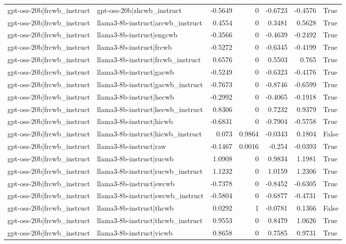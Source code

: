 \begin{table}
\begin{tabular}{l l r r r r l}
gpt-oss-20b|frcwb_instruct & gpt-oss-20b|zhcwb_instruct & -0.5649 & 0 & -0.6723 & -0.4576 & True \\
gpt-oss-20b|frcwb_instruct & llama3-8b-instruct|arcwb_instruct & 0.4554 & 0 & 0.3481 & 0.5628 & True \\
gpt-oss-20b|frcwb_instruct & llama3-8b-instruct|engcwb & -0.3566 & 0 & -0.4639 & -0.2492 & True \\
gpt-oss-20b|frcwb_instruct & llama3-8b-instruct|frcwb & -0.5272 & 0 & -0.6345 & -0.4199 & True \\
gpt-oss-20b|frcwb_instruct & llama3-8b-instruct|frcwb_instruct & 0.6576 & 0 & 0.5503 & 0.765 & True \\
gpt-oss-20b|frcwb_instruct & llama3-8b-instruct|gacwb & -0.5249 & 0 & -0.6323 & -0.4176 & True \\
gpt-oss-20b|frcwb_instruct & llama3-8b-instruct|gacwb_instruct & -0.7673 & 0 & -0.8746 & -0.6599 & True \\
gpt-oss-20b|frcwb_instruct & llama3-8b-instruct|hecwb & -0.2992 & 0 & -0.4065 & -0.1918 & True \\
gpt-oss-20b|frcwb_instruct & llama3-8b-instruct|hecwb_instruct & 0.8306 & 0 & 0.7232 & 0.9379 & True \\
gpt-oss-20b|frcwb_instruct & llama3-8b-instruct|hicwb & -0.6831 & 0 & -0.7904 & -0.5758 & True \\
gpt-oss-20b|frcwb_instruct & llama3-8b-instruct|hicwb_instruct & 0.073 & 0.9864 & -0.0343 & 0.1804 & False \\
gpt-oss-20b|frcwb_instruct & llama3-8b-instruct|raw & -0.1467 & 0.0016 & -0.254 & -0.0393 & True \\
gpt-oss-20b|frcwb_instruct & llama3-8b-instruct|rucwb & 1.0908 & 0 & 0.9834 & 1.1981 & True \\
gpt-oss-20b|frcwb_instruct & llama3-8b-instruct|rucwb_instruct & 1.1232 & 0 & 1.0159 & 1.2306 & True \\
gpt-oss-20b|frcwb_instruct & llama3-8b-instruct|swcwb & -0.7378 & 0 & -0.8452 & -0.6305 & True \\
gpt-oss-20b|frcwb_instruct & llama3-8b-instruct|swcwb_instruct & -0.5804 & 0 & -0.6877 & -0.4731 & True \\
gpt-oss-20b|frcwb_instruct & llama3-8b-instruct|thcwb & 0.0292 & 1 & -0.0781 & 0.1366 & False \\
gpt-oss-20b|frcwb_instruct & llama3-8b-instruct|thcwb_instruct & 0.9553 & 0 & 0.8479 & 1.0626 & True \\
gpt-oss-20b|frcwb_instruct & llama3-8b-instruct|vicwb & 0.8658 & 0 & 0.7585 & 0.9731 & True \\

\end{tabular}
\end{table}
